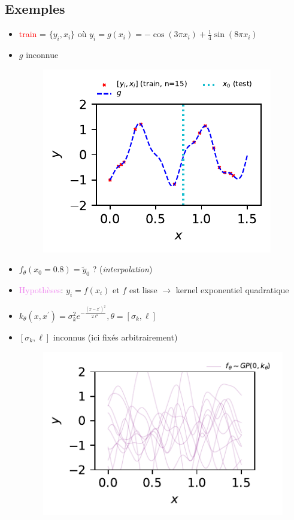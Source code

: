 \documentclass[xcolor=svgnames, t]{beamer}
\newcommand{\coloredemph}[1]{\textcolor{internationalblue}{\emph{#1}}}
\newcommand{\tored}[1]{\textcolor{red}{#1}}
\newcommand{\topurple}[1]{\textcolor{violet}{#1}}
\begin{document}
\subsection{Exemples}
\begin{frame}{\subsecname}
  \begin{itemize}
    \item\tored{train} = $\{y_i, x_i\}$ où $y_i = g(x_i) = - \cos(3 \pi x_i) + \frac{1}{4} \sin(8 \pi x_i)$
    \item $g$ inconnue
      \begin{figure}
        \includegraphics{gp_1D_example_noisefree_data.pdf}
      \end{figure}
    \item $f_\theta(x_0 = 0.8) = \tilde{y}_0$ ? (\coloredemph{interpolation})
  \end{itemize}
\end{frame}

\begin{frame}{\subsecname}
  \begin{itemize}
    \item<1-> \topurple{Hypothèses}: $y_i = f(x_i)$ et $f$ est lisse $\rightarrow$ kernel exponentiel quadratique
    \item $k_\theta (x, x^\prime) = \sigma_k^2 e^{- \frac{(x - x^\prime)^2}{2 \ell^2} }, \theta = [\sigma_k, \ell]$
    \item<2-> $[\sigma_k, \ell]$ inconnus (ici fixés arbitrairement)
      \begin{figure}
        \includegraphics{gp_1D_example_noisefree_data_prior.pdf}
      \end{figure}    
  \end{itemize}
\end{frame}
\end{document}
